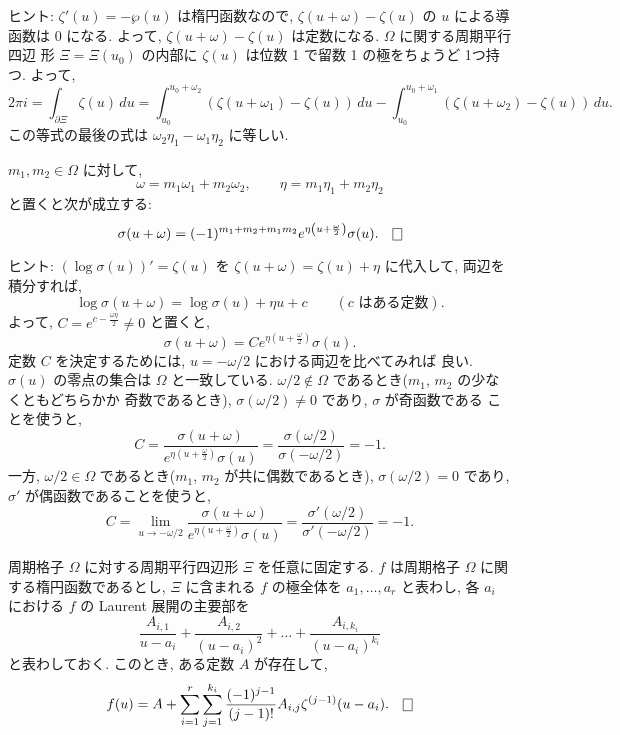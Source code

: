 \documentclass[12pt,twoside]{jarticle}
\def\pe{\wp}
\def\bdr{\partial}
\begin{document}
\noindent ヒント: $\zeta'(u)=-\pe(u)$ は楕円函数なので,
$\zeta(u+\omega)-\zeta(u)$ の $u$ による導函数は $0$ になる. よって,
$\zeta(u+\omega)-\zeta(u)$ は定数になる. $\Omega$ に関する周期平行四辺
形 $\Xi=\Xi(u_0)$ の内部に $\zeta(u)$ は位数 1 で留数 1 の極をちょうど
1つ持つ. よって,
\[
  2\pi i
  = \int_{\bdr \Xi} \zeta(u)\,du
  = \int_{u_0}^{u_0+\omega_2} (\zeta(u+\omega_1)-\zeta(u))\,du
  - \int_{u_0}^{u_0+\omega_1} (\zeta(u+\omega_2)-\zeta(u))\,du.
\]
この等式の最後の式は $\omega_2\eta_1-\omega_1\eta_2$ に等しい.

\begin{question}\qstar{*}
  $m_1,m_2\in\Omega$ に対して, %
  \[
    \omega = m_1 \omega_1 + m_2 \omega_2,
    \qquad
    \eta   = m_1 \eta_1   + m_2 \eta_2
  \] %
  と置くと次が成立する:
  \[
    \sigma(u+\omega) = 
    (-1)^{m_1+m_2+m_1m_2}
    e^{\eta \left( u + \frac{\omega}{2} \right)}
    \sigma(u).
  \qed
  \]
\end{question}

\noindent ヒント: $(\log\sigma(u))'=\zeta(u)$ を %
$\zeta(u+\omega)=\zeta(u)+\eta$ に代入して, 両辺を積分すれば,
\[
  \log\sigma(u+\omega) = \log\sigma(u) + \eta u + c
  \qquad
  (\text{$c$ はある定数}).
\]
よって, $C=e^{c- \frac{\omega\eta}{2}}\ne 0$ と置くと,
\[
  \sigma(u+\omega) = 
  C e^{\eta \left( u + \frac{\omega}{2} \right)}
  \sigma(u).
\]
定数 $C$ を決定するためには, $u=-\omega/2$ における両辺を比べてみれば
良い. $\sigma(u)$ の零点の集合は $\Omega$ と一致している. %
$\omega/2\not\in\Omega$ であるとき($m_1$, $m_2$ の少なくともどちらかか
奇数であるとき), $\sigma(\omega/2)\ne0$ であり, $\sigma$ が奇函数である
ことを使うと, 
\[
  C 
  = \frac{\sigma(u+\omega)}
    {e^{\eta \left( u + \frac{\omega}{2} \right)}\sigma(u)}
  = \frac{\sigma(\omega/2)}{\sigma(-\omega/2)} = -1.
\]
一方, $\omega/2\in\Omega$ であるとき($m_1$, $m_2$ が共に偶数であるとき),
$\sigma(\omega/2)=0$ であり, $\sigma'$ が偶函数であることを使うと,
\[
  C 
  = \lim_{u\to -\omega/2}
    \frac{\sigma(u+\omega)}
    {e^{\eta \left( u + \frac{\omega}{2} \right)}\sigma(u)}
  = \frac{\sigma'(\omega/2)}{\sigma'(-\omega/2)} = -1.
\]

\begin{question}\qstar{*}
  周期格子 $\Omega$ に対する周期平行四辺形 $\Xi$ を任意に固定する.
  $f$ は周期格子 $\Omega$ に関する楕円函数であるとし, $\Xi$ に含まれる
  $f$ の極全体を $a_1,\dots,a_r$ と表わし, 各 $a_i$ における $f$ の 
  Laurent 展開の主要部を
  \[
      \frac{A_{i,1}}{u-a_i}
    + \frac{A_{i,2}}{(u-a_i)^2}
    + \dots
    + \frac{A_{i,k_i}}{(u-a_i)^{k_i}}
  \] %
  と表わしておく. このとき, ある定数 $A$ が存在して,
  \[
    f(u) 
    = A +
    \sum_{i=1}^r \sum_{j=1}^{k_i}
    \frac{(-1)^{j-1}}{(j-1)!} A_{i,j} \zeta^{(j-1)}(u-a_i).
    \qed
  \]
\end{question}
\end{document}

